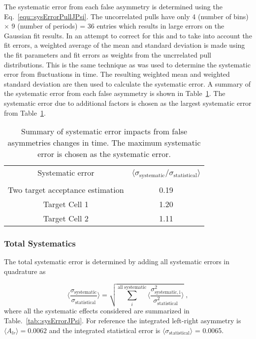 The systematic error from each false asymmetry is determined using the
Eq.~\ref{equ::sysErrorPullJPsi}.  The uncorrelated pulls have only 4 (number of
bins) $\times$ 9 (number of periods) = 36 entries which results in large errors
on the Gaussian fit results.  In an attempt to correct for this and to take into
account the fit errors, a weighted average of the mean and standard deviation is
made using the fit parameters and fit errors as weights from the uncrrelated
pull distributions.  This is the same technique as was used to determine the
systematic error from fluctuations in time.  The resulting weighted mean and
weighted standard deviation are then used to calculate the systematic error.  A
summary of the systematic error from each false asymmetry is shown in
Table~\ref{tab::faSysJPsi}.  The systematic error due to additional factors is
chosen as the largest systematic error from Table~\ref{tab::faSysJPsi}.

\begin{table}[h!t]
  \centering
  \begin{tabular}{|c|c|}
    \hline Systematic error& \multirow{2}{9em}{$\langle
      \sigma_{\mathrm{systematic}}/\sigma_{\mathrm{statistical}}
      \rangle$}\\ & \\ \hline

    Two target acceptance estimation& 0.19\\ \hline
    
    Target Cell 1& 1.20\\ \hline

    Target Cell 2& 1.11\\ \hline
    
  \end{tabular}
  \caption{Summary of systematic error impacts from false asymmetries changes in
    time.  The maximum systematic error is chosen as the systematic error.}
  \label{tab::faSysJPsi}
\end{table}

\subsubsection{Total Systematics}
The total systematic error is determined by adding all systematic errors in
quadrature as

\begin{equation}
  \Big \langle \frac{
    \sigma_{\mathrm{systematic}}}{\sigma_{\mathrm{statistical}}} \Big \rangle =
  \sqrt{ \sum_i^{\mathrm{all \; systematic}} \Big \langle
    \frac{\sigma^2_{\mathrm{systematic, i}}}{\sigma^2_{\mathrm{statistical}}}
    \Big \rangle } \;,
\end{equation}
where all the systematic effects considered are summarized in
Table.~\ref{tab::sysErrorJPsi}.  For reference the integrated left-right
asymmetry is $\langle A_{lr} \rangle = 0.0062$ and the integrated statistical
error is $\langle \sigma_{\mathrm{statistical}} \rangle$ = 0.0065.

